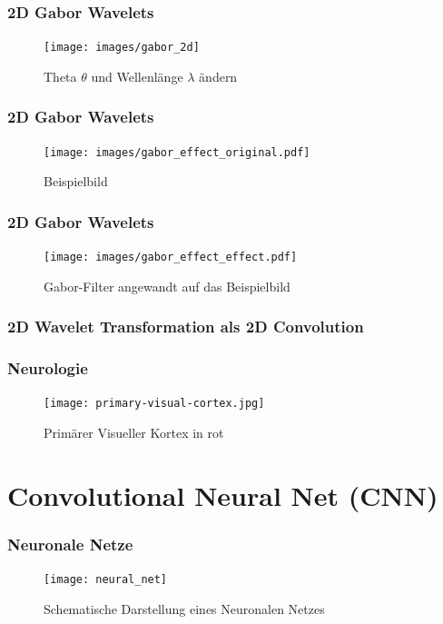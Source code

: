 \documentclass{beamer}
\begin{document}
\begin{frame}
\frametitle{2D Gabor Wavelets}
	\begin{figure}
		\centering
		\texttt{[image: images/gabor\_2d]}
		\caption{Theta $\theta$ und Wellenlänge $\lambda$ ändern}
		\label{fig:gabor2d}
	\end{figure}	

\end{frame}

\begin{frame}
\frametitle{2D Gabor Wavelets}
\begin{figure}
	\centering
	\texttt{[image: images/gabor\_effect\_original.pdf]}
	\caption{Beispielbild}
	\label{fig:gabororiginal}
\end{figure}	
\end{frame}

\begin{frame}
\frametitle{2D Gabor Wavelets}
\begin{figure}
	\centering
	\texttt{[image: images/gabor\_effect\_effect.pdf]}
	\caption{Gabor-Filter angewandt auf das Beispielbild}
	\label{fig:gaboreffect}
\end{figure}	

\end{frame}

\begin{frame}
\frametitle{2D Wavelet Transformation als 2D Convolution}

\end{frame}


\begin{frame}
	\frametitle{Neurologie}
	\begin{figure}
		\centering
		\texttt{[image: primary-visual-cortex.jpg]}
		\caption{Primärer Visueller Kortex in rot}
		\label{fig:primary-visual-cortex}
	\end{figure}
	
\end{frame}

\section{Convolutional Neural Net (CNN)}
\begin{frame}
\frametitle{Neuronale Netze}
\begin{figure}
	\centering
	\texttt{[image: neural\_net]}
	\caption{Schematische Darstellung eines Neuronalen Netzes}
	\label{fig:neuralnet}
\end{figure}

\end{frame}
\end{document}
